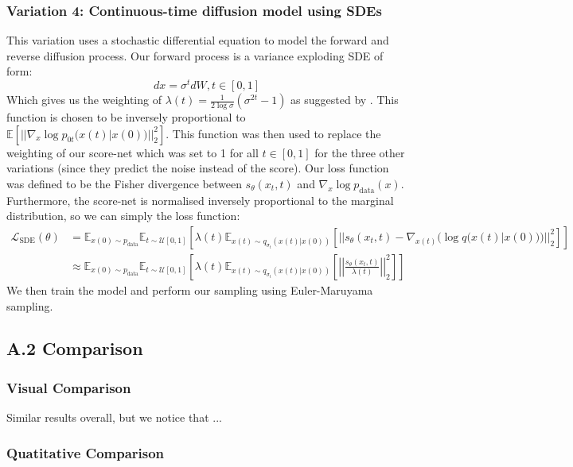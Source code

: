 \subsubsection{Variation 4: Continuous-time diffusion model using SDEs}

This variation uses a stochastic differential equation to model the forward and reverse diffusion process. 
Our forward process is a variance exploding SDE of form:
\begin{equation}
  dx = \sigma ^ t dW, t \in [0, 1]
\end{equation}
Which gives us the weighting of
$\lambda(t) = \frac{1}{2 \log \sigma} (\sigma^{2t}-1)$ as suggested by \cite{yang_song}.
This function is chosen to be inversely proportional to $\mathbb{E}[||\nabla_x \log p_{0t}(x(t) | x(0))||^2_2]$.
This function was then used to replace the weighting of our score-net
which was set to 1 for all $t \in [0, 1]$ for the three other variations (since they predict the noise instead of the score).
Our loss function was defined to be the Fisher divergence between $s_\theta(x_t, t)$ and $\nabla_x \log p_{\text{data}}(x)$.
Furthermore, the score-net is normalised 
inversely proportional to the marginal distribution, so we can simply the loss function:
\begin{align}
  \mathcal{L}_\text{SDE}(\theta) &= \mathbb{E}_{x(0) \sim p_\text{data}} \mathbb{E}_{t \sim \mathcal{U}[0, 1]} \left[ 
  \lambda(t) \mathbb{E}_{x(t) \sim q_{\sigma_t}(x(t) | x(0))} \left[
    ||s_\theta (x_t, t) - \nabla_{x(t)} (\log q(x(t) | x(0)))||^2_2
    \right]\right]\\
    &\approx \mathbb{E}_{x(0) \sim p_\text{data}} \mathbb{E}_{t \sim \mathcal{U}[0, 1]} \left[ 
  \lambda(t) \mathbb{E}_{x(t) \sim q_{\sigma_t}(x(t) | x(0))} \left[
    \left|\left|\frac{s_\theta(x_t, t)}{\lambda(t)}\right|\right|^2_2
    \right]\right]
\end{align}
We then train the model and perform our sampling using Euler-Maruyama sampling.

\subsection{A.2 Comparison}

\subsubsection{Visual Comparison}



Similar results overall, but we notice that ...



\subsubsection{Quatitative Comparison}

